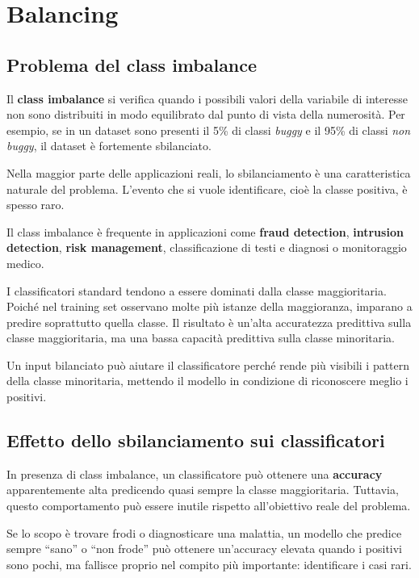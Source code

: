 \chapter{Balancing}

\section{Problema del class imbalance}

Il \textbf{class imbalance} si verifica quando i possibili valori della variabile di interesse non sono distribuiti in modo equilibrato dal punto di vista della numerosità. Per esempio, se in un dataset sono presenti il 5\% di classi \emph{buggy} e il 95\% di classi \emph{non buggy}, il dataset è fortemente sbilanciato.

Nella maggior parte delle applicazioni reali, lo sbilanciamento è una caratteristica naturale del problema. L'evento che si vuole identificare, cioè la classe positiva, è spesso raro.

\begin{notaslide}
Il class imbalance è frequente in applicazioni come \textbf{fraud detection}, \textbf{intrusion detection}, \textbf{risk management}, classificazione di testi e diagnosi o monitoraggio medico.
\end{notaslide}

I classificatori standard tendono a essere dominati dalla classe maggioritaria. Poiché nel training set osservano molte più istanze della maggioranza, imparano a predire soprattutto quella classe. Il risultato è un'alta accuratezza predittiva sulla classe maggioritaria, ma una bassa capacità predittiva sulla classe minoritaria.

Un input bilanciato può aiutare il classificatore perché rende più visibili i pattern della classe minoritaria, mettendo il modello in condizione di riconoscere meglio i positivi.

\section{Effetto dello sbilanciamento sui classificatori}

In presenza di class imbalance, un classificatore può ottenere una \textbf{accuracy} apparentemente alta predicendo quasi sempre la classe maggioritaria. Tuttavia, questo comportamento può essere inutile rispetto all'obiettivo reale del problema.

\begin{notaprof}
Se lo scopo è trovare frodi o diagnosticare una malattia, un modello che predice sempre ``sano'' o ``non frode'' può ottenere un'accuracy elevata quando i positivi sono pochi, ma fallisce proprio nel compito più importante: identificare i casi rari.
\end{notaprof}

